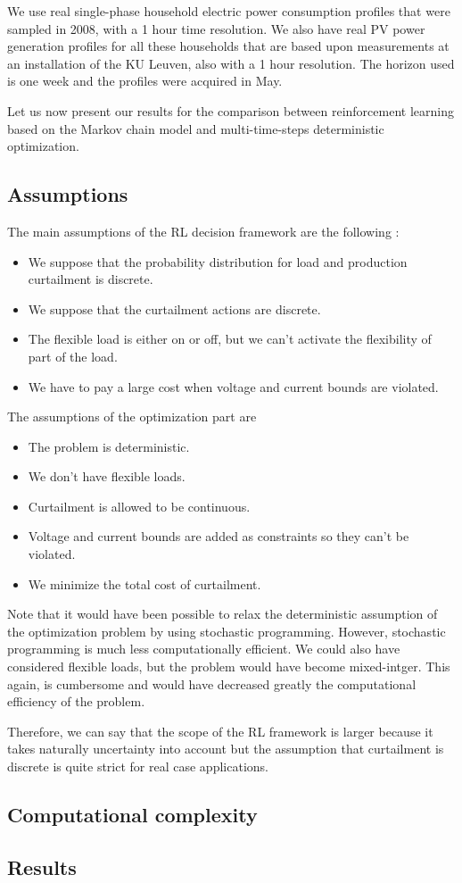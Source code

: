 We use real single-phase household electric power consumption profiles 
that were sampled in 2008, with a 1 hour time resolution.
We also have real PV power generation profiles for all these households that are based upon measurements at an installation of the KU Leuven, also with a 1 hour resolution.
The horizon used is one week and the profiles were acquired in May.

Let us now present our results for the comparison between reinforcement learning based on the Markov chain model and multi-time-steps deterministic optimization.

\subsection{Assumptions}

The main assumptions of the RL decision framework are the following :
\begin{itemize}
\item We suppose that the probability distribution for load and production curtailment is discrete.
\item We suppose that the curtailment actions are discrete.
\item The flexible load is either on or off, but we can't activate the flexibility of part of the load.
\item We have to pay a large cost when voltage and current bounds are violated.
\end{itemize}

The assumptions of the optimization part are
\begin{itemize}
\item The problem is deterministic.
\item We don't have flexible loads.
\item Curtailment is allowed to be continuous.
\item Voltage and current bounds are added as constraints so they can't be violated.
\item We minimize the total cost of curtailment. 
\end{itemize}

Note that it would have been possible to relax the deterministic assumption of the optimization problem by using stochastic programming.
However, stochastic programming is much less computationally efficient.
We could also have considered flexible loads, but the problem would have become mixed-intger.
This again, is cumbersome and would have decreased greatly the computational efficiency of the problem.

Therefore, we can say that the scope of the RL framework is larger because it takes naturally uncertainty into account but the assumption that curtailment is discrete is quite strict for real case applications.

\subsection{Computational complexity}



\subsection{Results}
